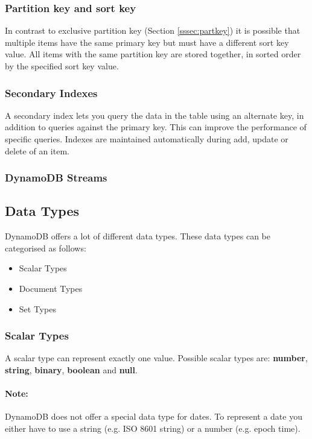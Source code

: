 \subsubsection{Partition key and sort key}
In contrast to exclusive partition key (Section \ref{sssec:partkey}) it is possible that multiple items have the same primary key but must have a different sort key value. All items with the same partition key are stored together, in sorted order by the specified sort key value.

\subsubsection{Secondary Indexes}
A secondary index lets you query the data in the table using an alternate key, in addition to queries against the primary key. This can improve the performance of specific queries.
Indexes are maintained automatically during add, update or delete of an item. 


\subsubsection{DynamoDB Streams}

\subsection{Data Types}
DynamoDB offers a lot of different data types. These data types can be categorised as follows:

\begin{itemize}
    \item Scalar Types
    \item Document Types
    \item Set Types
\end{itemize}

\subsubsection{Scalar Types}
\label{sssec:scalar}
A scalar type can represent exactly one value. Possible scalar types are: \textbf{number}, \textbf{string}, \textbf{binary}, \textbf{boolean} and \textbf{null}.

\paragraph{Note:} DynamoDB does not offer a special data type for dates. To represent a date you either have to use a string (e.g. ISO 8601 string) or a number (e.g. epoch time).

